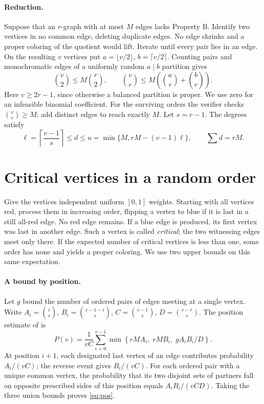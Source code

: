 \documentclass[11pt,a4paper]{article}
\newcommand{\N}{\binom}
\begin{document}
\paragraph{Reduction.} Suppose that an $r$-graph with at most $M$ edges lacks Property B. Identify two vertices in no common edge, deleting duplicate edges. No edge shrinks and a proper coloring of the quotient would lift. Iterate until every pair lies in an edge. On the resulting $v$ vertices put $a=\lfloor v/2\rfloor$, $b=\lceil v/2\rceil$. Counting pairs and monochromatic edges of a uniformly random $a\mid b$ partition gives
\begin{equation}\label{eq:v}
\N v2\le M\N r2,\qquad \N vr\le M\left(\N ar+\N br\right).
\end{equation}
Here $v\ge2r-1$, since otherwise a balanced partition is proper. We use zero for an infeasible binomial coefficient. For the surviving orders the verifier checks $\binom vr\ge M$; add distinct edges to reach exactly $M$. Let $s=r-1$. The degrees satisfy
\begin{equation}\label{eq:d}
\ell=\left\lceil\frac{v-1}{s}\right\rceil\le d\le u=\min\{M,rM-(v-1)\ell\},\qquad \sum d=rM .
\end{equation}
\newpage
\section{Critical vertices in a random order}
Give the vertices independent uniform $[0,1]$ weights. Starting with all vertices red, process them in increasing order, flipping a vertex to blue if it is last in a still all-red edge. No red edge remains. If a blue edge is produced, its first vertex was last in another edge. Such a vertex is called \emph{critical}; the two witnessing edges meet only there. If the expected number of critical vertices is less than one, some order has none and yields a proper coloring. We use two upper bounds on this same expectation.
\paragraph{A bound by position.} Let $g$ bound the number of ordered pairs of edges meeting at a single vertex. Write $A_i=\binom{i}{s}$, $B_i=\binom{v-1-i}{s}$, $C=\binom{v-1}{s}$, $D=\binom{v-r}{s}$. The position estimate of \cite[Eq.~(8)]{gl} is
\begin{equation}\label{eq:pos}
P(v)=\frac{1}{vC}\sum_{i=0}^{v-1}\min\left\{rM A_i,\;rM B_i,\; g A_iB_i/D\right\}.
\end{equation}
At position $i+1$, each designated last vertex of an edge contributes probability $A_i/(vC)$; the reverse event gives $B_i/(vC)$. For each ordered pair with a unique common vertex, the probability that its two disjoint sets of partners fall on opposite prescribed sides of this position equals $A_iB_i/(vCD)$. Taking the three union bounds proves \eqref{eq:pos}.
\end{document}
